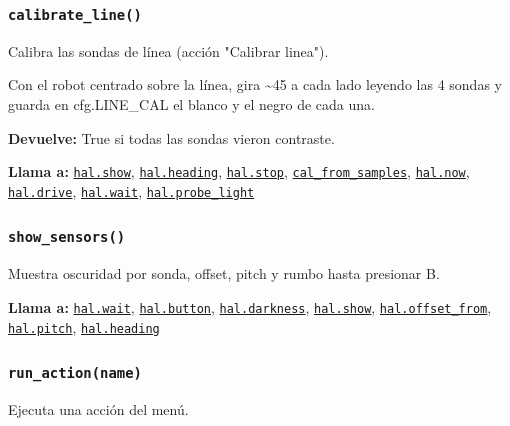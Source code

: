 \subsubsection{\texttt{calibrate\_\allowbreak{}line()}}\label{fn:settings:calibrate-line}
\noindent Calibra las sondas de línea (acción "Calibrar linea").

Con el robot centrado sobre la línea, gira \textasciitilde{}45\textdegree{} a cada lado leyendo las 4 sondas y guarda en cfg.LINE\_CAL el blanco y el negro de cada una.

\noindent\textbf{Devuelve:} True si todas las sondas vieron contraste.\par
\noindent\textbf{Llama a:} \hyperref[fn:hal:show]{\texttt{hal.show}}, \hyperref[fn:hal:heading]{\texttt{hal.heading}}, \hyperref[fn:hal:stop]{\texttt{hal.stop}}, \hyperref[fn:settings:cal-from-samples]{\texttt{cal\_\allowbreak{}from\_\allowbreak{}samples}}, \hyperref[fn:hal:now]{\texttt{hal.now}}, \hyperref[fn:hal:drive]{\texttt{hal.drive}}, \hyperref[fn:hal:wait]{\texttt{hal.wait}}, \hyperref[fn:hal:probe-light]{\texttt{hal.probe\_\allowbreak{}light}}\par

\subsubsection{\texttt{show\_\allowbreak{}sensors()}}\label{fn:settings:show-sensors}
\noindent Muestra oscuridad por sonda, offset, pitch y rumbo hasta presionar B.

\noindent\textbf{Llama a:} \hyperref[fn:hal:wait]{\texttt{hal.wait}}, \hyperref[fn:hal:button]{\texttt{hal.button}}, \hyperref[fn:hal:darkness]{\texttt{hal.darkness}}, \hyperref[fn:hal:show]{\texttt{hal.show}}, \hyperref[fn:hal:offset-from]{\texttt{hal.offset\_\allowbreak{}from}}, \hyperref[fn:hal:pitch]{\texttt{hal.pitch}}, \hyperref[fn:hal:heading]{\texttt{hal.heading}}\par

\subsubsection{\texttt{run\_\allowbreak{}action(name)}}\label{fn:settings:run-action}
\noindent Ejecuta una acción del menú.

